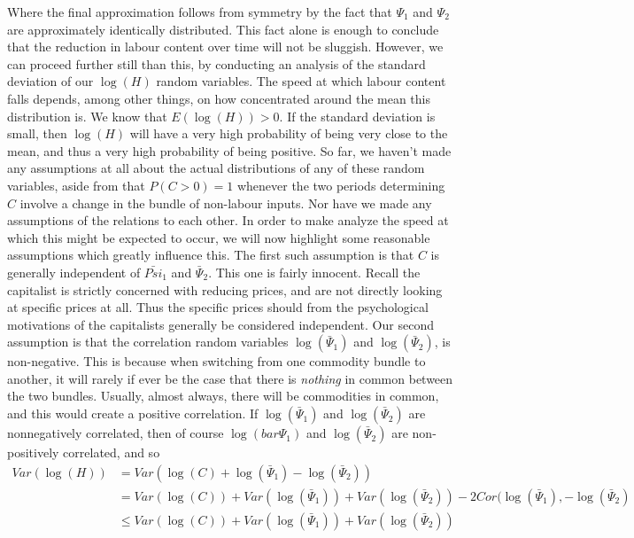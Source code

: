 Where the final approximation follows from symmetry by the fact that $\Psi_1$ and $\Psi_2$ are approximately identically distributed. This fact alone is enough to conclude that the reduction in labour content over time will not be sluggish. However, we can proceed further still than this, by conducting an analysis of the standard deviation of our $\log(H)$ random variables. The speed at which labour content falls depends, among other things, on how concentrated around the mean this distribution is. We know that $E(\log(H))>0$. If the standard deviation is small, then $\log(H)$ will have a very high probability of being very close to the mean, and thus a very high probability of being positive. So far, we haven't made any assumptions at all about the actual distributions of any of these random variables, aside from that $P(C > 0) = 1$ whenever the two periods determining $C$ involve a change in the bundle of non-labour inputs. Nor have we made any assumptions of the relations to each other. In order to make analyze the speed at which this might be expected to occur, we will now highlight some reasonable assumptions which greatly influence this. The first such assumption is that $C$ is generally independent of $\bar{Psi}_1$ and $\bar{\Psi}_2$. This one is fairly innocent. Recall the capitalist is strictly concerned with reducing prices, and are not directly looking at specific prices at all. Thus the specific prices should from the psychological motivations of the capitalists generally be considered independent. Our second assumption is that the correlation random variables $\log(\bar{\Psi}_1)$ and $\log(\bar{\Psi}_2)$, is non-negative. This is because when switching from one commodity bundle to another, it will rarely if ever be the case that there is \textit{nothing} in common between the two bundles. Usually, almost always, there will be commodities in common, and this would create a positive correlation. If $\log(\bar{\Psi}_1)$ and $\log(\bar{\Psi}_2)$ are nonnegatively correlated, then of course $\log(bar{\Psi}_1)$ and $\log(\bar{\Psi}_2)$ are non-positively correlated, and so  
\begin{align}
	Var(\log(H)) &= Var(\log(C)+\log(\bar{\Psi}_1)-\log(\bar{\Psi}_2)) \\
			&= Var(\log(C))+Var(\log(\bar{\Psi}_1)) + Var(\log(\bar{\Psi}_2)) - 2Cor(\log(\bar{\Psi}_1),-\log(\bar{\Psi}_2)\\
			&\leq Var(\log(C))+Var(\log(\bar{\Psi}_1)) + Var(\log(\bar{\Psi}_2))
\end{align}
